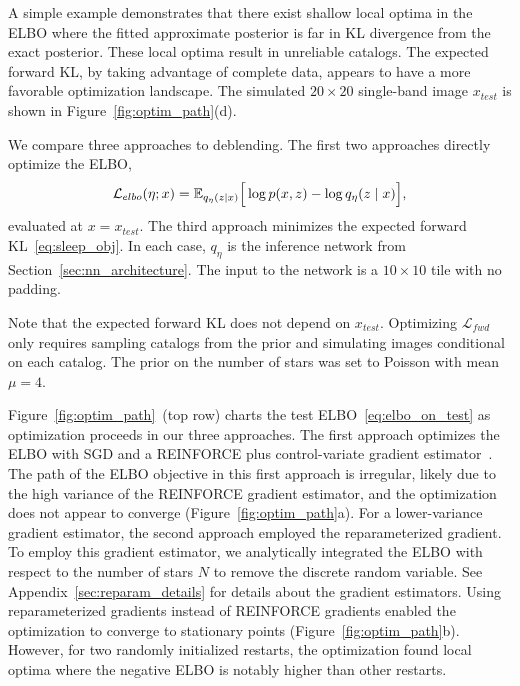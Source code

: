 

\label{sec:elbo_sleep_compare}

A simple example demonstrates that there exist shallow local optima in the ELBO
where the fitted approximate posterior is far in KL divergence from the exact posterior.
These local optima result in unreliable catalogs.
The expected forward KL, by taking advantage of complete data, appears to have a more favorable optimization landscape.
The simulated $20\times20$ single-band image $x_{test}$ is shown in Figure~\ref{fig:optim_path}(d).

We compare three approaches to deblending. The first two approaches directly optimize the ELBO,
\begin{align}
\mathcal{L}_{elbo}(\eta; x) = \mathbb{E}_{q_{\eta}(z \mid x)}\Big[\log p(x, z) - \log q_{\eta}(z \mid x)\Big],
\label{eq:elbo_on_test}
\end{align}
evaluated at $x = x_{test}$. 
The third approach minimizes the expected forward KL~\eqref{eq:sleep_obj}.
In each case, $q_\eta$ is the inference network from Section~\ref{sec:nn_architecture}.
The input to the network is a $10\times 10$ tile with no padding.

Note that the expected forward KL does not depend on $x_{test}$.
Optimizing $\mathcal{L}_{fwd}$ only requires sampling catalogs from the prior
and simulating images conditional on each catalog.
The prior on the number of stars was set to Poisson with mean $\mu = 4$.

Figure~\ref{fig:optim_path}~(top row) charts the test ELBO~\eqref{eq:elbo_on_test}
as optimization proceeds in our three approaches.
The first approach optimizes the ELBO with SGD and a REINFORCE plus control-variate gradient estimator~\citep{ranganath2013black}.
The path of the ELBO objective in this first approach is irregular, likely due to the high variance of the REINFORCE gradient estimator, 
and the optimization does not appear to converge (Figure~\ref{fig:optim_path}a).
For a lower-variance gradient estimator, the second approach employed the reparameterized gradient. To employ this gradient estimator, we analytically integrated the ELBO with respect to the number of stars $N$ to remove the discrete random variable.
See Appendix~\ref{sec:reparam_details} for details about the gradient estimators.
Using reparameterized gradients instead of REINFORCE gradients enabled the optimization to converge to stationary points (Figure~\ref{fig:optim_path}b).
However, for two randomly initialized restarts,
the optimization found local optima where the negative ELBO is notably higher than other restarts.

